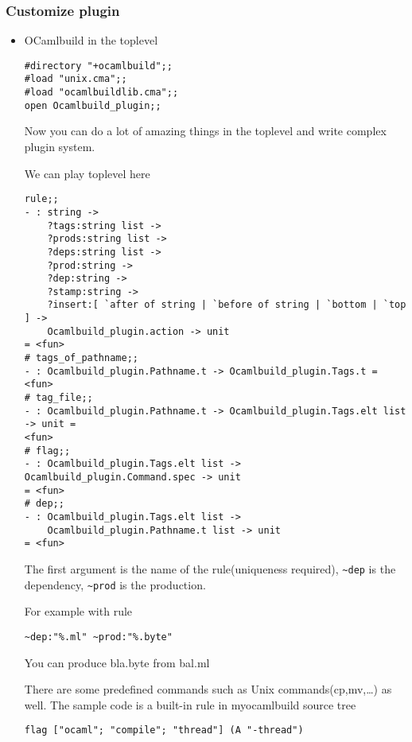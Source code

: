 \documentclass[11pt]{article}
\begin{document}
\subsubsection*{Customize plugin}
\label{sec-1-12-2}
\begin{itemize}

\item OCamlbuild in the toplevel\\
\label{sec-1-12-2-1}%
\begin{verbatim}
#directory "+ocamlbuild";;
#load "unix.cma";;
#load "ocamlbuildlib.cma";;
open Ocamlbuild_plugin;;
\end{verbatim}

     Now you can do a lot of amazing things in the toplevel and write
     complex plugin system.


     We can play toplevel here




\begin{verbatim}
rule;;
- : string ->
    ?tags:string list ->
    ?prods:string list ->
    ?deps:string list ->
    ?prod:string ->
    ?dep:string ->
    ?stamp:string ->
    ?insert:[ `after of string | `before of string | `bottom | `top ] ->
    Ocamlbuild_plugin.action -> unit
= <fun>
# tags_of_pathname;;
- : Ocamlbuild_plugin.Pathname.t -> Ocamlbuild_plugin.Tags.t = <fun>
# tag_file;;
- : Ocamlbuild_plugin.Pathname.t -> Ocamlbuild_plugin.Tags.elt list -> unit =
<fun>
# flag;;
- : Ocamlbuild_plugin.Tags.elt list -> Ocamlbuild_plugin.Command.spec -> unit
= <fun>
# dep;;
- : Ocamlbuild_plugin.Tags.elt list ->
    Ocamlbuild_plugin.Pathname.t list -> unit
= <fun>
\end{verbatim}

     The first argument is the name of the rule(uniqueness required),
     \texttt{\textasciitilde{}dep} is the dependency, \texttt{\textasciitilde{}prod} is the production.

     For example with rule

\begin{verbatim}
~dep:"%.ml" ~prod:"%.byte"
\end{verbatim}
     You can produce bla.byte from bal.ml

     There are some predefined commands such as Unix
     commands(cp,mv,\ldots{}) as well.
     The sample code is a built-in rule in myocamlbuild source tree



\begin{verbatim}
flag ["ocaml"; "compile"; "thread"] (A "-thread")
\end{verbatim}


\end{itemize}
\end{document}
